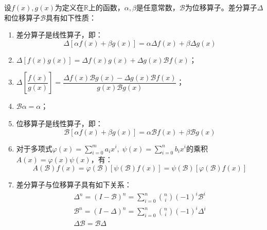 \begin{property}
	设$f(x),g(x)$为定义在$\mathbb{R}$上的函数，$\alpha,\beta$是任意常数，$\mathcal{B}$为位移算子。差分算子$\Delta$和位移算子$\mathcal{B}$具有如下性质：
	\begin{enumerate}
		\item 差分算子是线性算子，即：
		\begin{equation*}
			\Delta[\alpha f(x)+\beta g(x)]=\alpha\Delta f(x)+\beta\Delta g(x)
		\end{equation*}
		\item $\Delta[f(x)g(x)]=\Delta f(x)g(x)+\Delta g(x)\mathcal{B}f(x)$；
		\item $\Delta\left[\dfrac{f(x)}{g(x)}\right]=\dfrac{\Delta f(x)\mathcal{B}g(x)-\Delta g(x)\mathcal{B}f(x)}{g(x)\mathcal{B}g(x)}$；
		\item $\mathcal{B}\alpha=\alpha$；
		\item 位移算子是线性算子，即：
		\begin{equation*}
			\mathcal{B}[\alpha f(x)+\beta g(x)]=\alpha\mathcal{B}f(x)+\beta\mathcal{B}g(x)
		\end{equation*}
		\item 对于多项式$\varphi(x)=\sum\limits_{i=0}^{m}a_ix^i,\;\psi(x)=\sum\limits_{i=0}^{n}b_ix^i$的乘积$A(x)=\varphi(x)\psi(x)$，有：
		\begin{equation*}
			A(\mathcal{B})f(x)=\varphi(\mathcal{B})[\psi(\mathcal{B})f(x)]=\psi(\mathcal{B})[\varphi(\mathcal{B})f(x)]
		\end{equation*}
		\item 差分算子与位移算子具有如下关系：
		\begin{gather*}
			\Delta^n=(I-\mathcal{B})^n=\sum_{i=0}^{n}\binom{n}{i}(-1)^i\mathcal{B}^i \\
			\mathcal{B}^n=(I-\Delta)^n=\sum_{i=0}^{n}\binom{n}{i}(-1)^i\Delta^i \\
			\Delta\mathcal{B}=\mathcal{B}\Delta
		\end{gather*}
	\end{enumerate}
\end{property}
